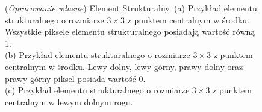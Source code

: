 \documentclass{article}
\begin{document}
        \begin{figure}[H]
            \centering
            \qquad
            \qquad
            \qquad
            \qquad
            \caption{(\textit{Opracowanie własne}) Element Strukturalny.
            (a) Przykład elementu strukturalnego o rozmiarze \(3 \times 3\) z punktem centralnym w środku.
            Wszystkie piksele elementu strukturalnego posiadają wartość równą 1.\\
            (b) Przykład elementu strukturalnego o rozmiarze \(3 \times 3\) z punktem centralnym w środku.
            Lewy dolny, lewy górny, prawy dolny oraz prawy górny piksel posiada wartość 0.\\
            (c) Przykład elementu strukturalnego o rozmiarze \(3 \times 3\) z punktem centralnym w lewym dolnym rogu.
}
\end{figure}
\end{document}

